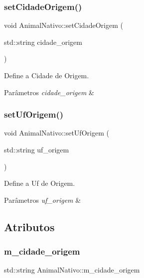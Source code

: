 \subsubsection{\texorpdfstring{set\+Cidade\+Origem()}{setCidadeOrigem()}}
{\footnotesize\ttfamily void Animal\+Nativo\+::set\+Cidade\+Origem (\begin{DoxyParamCaption}\item[{std\+::string}]{cidade\+\_\+origem }\end{DoxyParamCaption})}



Define a Cidade de Origem. 


\begin{DoxyParams}{Parâmetros}
{\em cidade\+\_\+origem} & \\
\hline
\end{DoxyParams}
\mbox{\label{classAnimalNativo_a4d91de201fea070524bb0c7524116f0a}} 
\subsubsection{\texorpdfstring{set\+Uf\+Origem()}{setUfOrigem()}}
{\footnotesize\ttfamily void Animal\+Nativo\+::set\+Uf\+Origem (\begin{DoxyParamCaption}\item[{std\+::string}]{uf\+\_\+origem }\end{DoxyParamCaption})}



Define a Uf de Origem. 


\begin{DoxyParams}{Parâmetros}
{\em uf\+\_\+origem} & \\
\hline
\end{DoxyParams}


\subsection{Atributos}
\mbox{\label{classAnimalNativo_a75c1303463bb16fa7c19e7467e43e1e7}} 
\subsubsection{\texorpdfstring{m\+\_\+cidade\+\_\+origem}{m\_cidade\_origem}}
{\footnotesize\ttfamily std\+::string Animal\+Nativo\+::m\+\_\+cidade\+\_\+origem\hspace{0.3cm}{\ttfamily [protected]}}

